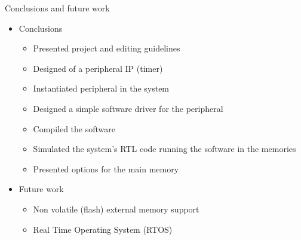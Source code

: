 \documentclass [xcolor=svgnames, t] {beamer}
\begin{document}
\begin{frame}{Conclusions and future work}

\begin{itemize}
  \item Conclusions
    \begin{itemize}
    \item Presented project and editing guidelines
    \item Designed of a peripheral IP (timer)
    \item Instantiated peripheral in the system 
    \item Designed a simple software driver for the peripheral
    \item Compiled the software
    \item Simulated the system's RTL code running the software in the memories
    \item Presented options for the main memory
    \end{itemize}
  \item Future work
    \begin{itemize}
    \item Non volatile (flash) external memory support
    \item Real Time Operating System (RTOS) 
    \end{itemize}
\end{itemize}

\end{frame}




\end{document}
